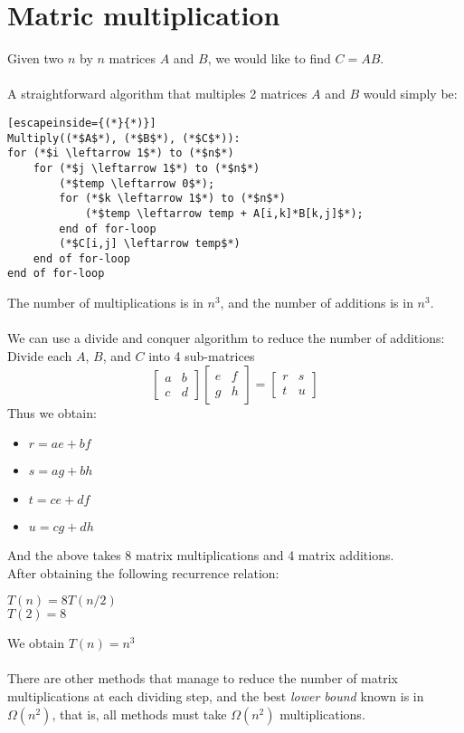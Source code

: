 \documentclass[a4paper]{article}
\begin{document}
\section{Matric multiplication}
Given two $n$ by $n$ matrices $A$ and $B$, we would like to find $C=AB$.\\
\\A straightforward algorithm that multiples 2 matrices $A$ and $B$ would simply be:
\begin{lstlisting}[escapeinside={(*}{*)}]
Multiply((*$A$*), (*$B$*), (*$C$*)):
for (*$i \leftarrow 1$*) to (*$n$*)
	for (*$j \leftarrow 1$*) to (*$n$*)
		(*$temp \leftarrow 0$*);
		for (*$k \leftarrow 1$*) to (*$n$*)
			(*$temp \leftarrow temp + A[i,k]*B[k,j]$*);
		end of for-loop
		(*$C[i,j] \leftarrow temp$*)
	end of for-loop
end of for-loop
\end{lstlisting}
The number of multiplications is in $n^3$, and the number of additions is in $n^3$.\\
\\ We can use a divide and conquer algorithm to reduce the number of additions:\\
Divide each $A$, $B$, and $C$ into 4 sub-matrices
\[
\begin{bmatrix}
a & b \\
c & d
\end{bmatrix}
\begin{bmatrix}
e & f \\
g & h
\end{bmatrix}
=
\begin{bmatrix}
r & s \\
t & u
\end{bmatrix}
\]
Thus we obtain:
\begin{itemize}
	\item[] $r=ae+bf$
	\item[] $s=ag+bh$
	\item[] $t=ce+df$
	\item[] $u=cg+dh$
\end{itemize}
And the above takes 8 matrix multiplications and 4 matrix additions.\\
After obtaining the following recurrence relation:
\begin{center}
	$T(n) = 8T(n/2)$\\
	$T(2) = 8$
\end{center}
We obtain $T(n) = n^3$\\
\\There are other methods that manage to reduce the number of matrix multiplications at each dividing step, and the best \textit{lower bound} known is in $\Omega(n^2)$, that is, all methods must take $\Omega(n^2)$ multiplications.
\appendix
\end{document}
